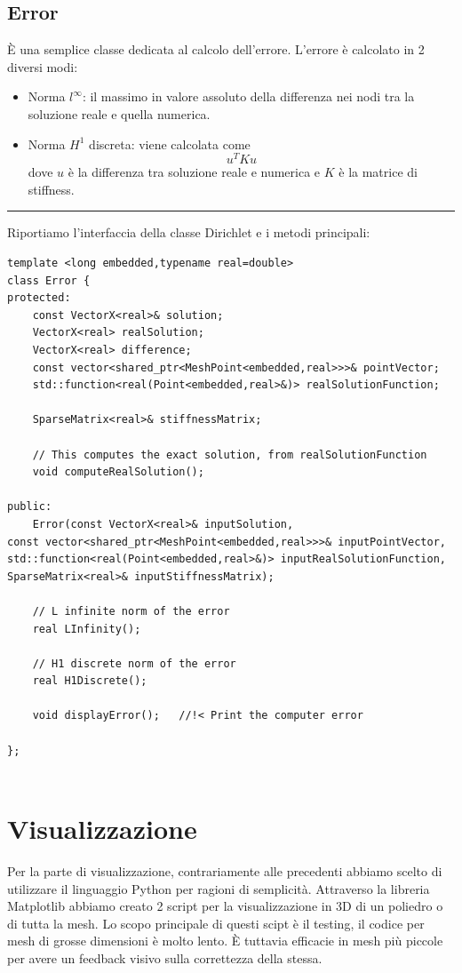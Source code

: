\documentclass[oneside,12pt]{book}  %
\theoremstyle{plain}
\theoremstyle{definition}
\theoremstyle{remark}
\numberwithin{equation}{chapter} %
\begin{document}
\subsection{Error}
\`E una semplice classe dedicata al calcolo dell'errore. L'errore \`e
calcolato in 2 diversi modi:
\begin{itemize}
\item Norma $l^\infty$: il massimo in valore assoluto della differenza
  nei nodi tra la soluzione reale e quella numerica.

\item Norma $H^1$ discreta: viene calcolata come $$u^TKu$$ dove $u$
  \`e la differenza tra soluzione reale e numerica e $K$ \`e la matrice di stiffness.

\end{itemize}

\noindent\rule{14cm}{1pt}

Riportiamo l'interfaccia della classe Dirichlet e i metodi principali:

\begin{verbatim}
template <long embedded,typename real=double>
class Error {
protected:
    const VectorX<real>& solution;
    VectorX<real> realSolution;
    VectorX<real> difference;
    const vector<shared_ptr<MeshPoint<embedded,real>>>& pointVector;
    std::function<real(Point<embedded,real>&)> realSolutionFunction;
	
    SparseMatrix<real>& stiffnessMatrix;
	
    // This computes the exact solution, from realSolutionFunction
    void computeRealSolution(); 
	
public:
    Error(const VectorX<real>& inputSolution,
const vector<shared_ptr<MeshPoint<embedded,real>>>& inputPointVector,
std::function<real(Point<embedded,real>&)> inputRealSolutionFunction,
SparseMatrix<real>& inputStiffnessMatrix);

    // L infinite norm of the error
    real LInfinity();
	
    // H1 discrete norm of the error
    real H1Discrete();
	
    void displayError();   //!< Print the computer error
	
};


\end{verbatim}

\section{Visualizzazione }
\label{sec:visualizzazione}
Per la parte di visualizzazione, contrariamente alle precedenti
abbiamo scelto di utilizzare il linguaggio Python per ragioni di
semplicit\`a. 
Attraverso la libreria Matplotlib abbiamo creato 2 script per la
visualizzazione in 3D di un poliedro o di tutta la mesh. Lo scopo
principale di questi scipt \`e il testing, il codice per mesh di
grosse dimensioni \`e molto lento. \`E tuttavia efficacie in mesh
pi\`u piccole per avere un feedback visivo sulla correttezza della
stessa. 
\end{document}
